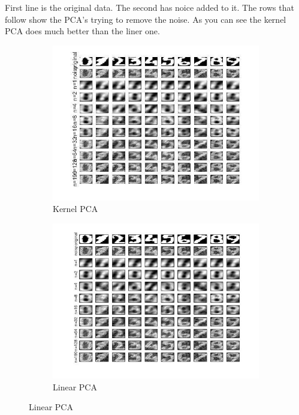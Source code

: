 \documentclass[11pt,oneside,a4paper]{article}
\begin{document}
First line is the original data. The second has noice added to it. The rows that follow show the PCA's trying to remove the noise. As you can see the kernel PCA does much better than the liner one. 
\begin{figure}[H]
	\begin{subfigure}[b]{0.5\textwidth}
		\includegraphics[width=\textwidth]{../Figures/hand}
		\caption{Kernel PCA}
	\end{subfigure}
	\begin{subfigure}[b]{0.5\textwidth}
		\includegraphics[width=\textwidth]{../Figures/linear_hand}
		\caption{Linear PCA}
	\end{subfigure}
	
\end{figure}
\end{document}
